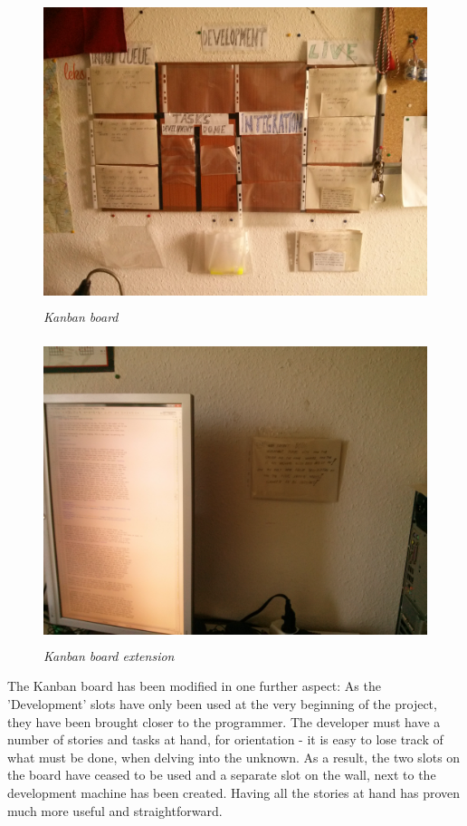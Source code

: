 \documentclass{article}
\begin{document}
\begin{figure}
\includegraphics[height=3.5in,width=6.23in]{./images/kanban/kanban_board.jpg}  
\caption{\small \sl Kanban board \label{fig:kanbanBoard}}
\end{figure}

\begin{figure}
\includegraphics[height=3.5in,width=6.23in]{./images/kanban/kanban_board_extension.jpg}  
\caption{\small \sl Kanban board extension\label{fig:kanbanBoardExtension}}
\end{figure}


The Kanban board has been modified in one further aspect: As the 'Development'
slots have only been used at the very beginning of the project, they have been
brought closer to the programmer. The developer must have a number of stories
and tasks at hand, for orientation - it is easy to lose track of what must be
done, when delving into the unknown. As a result, the two slots on the board
have ceased to be used and a separate slot on the wall, next to the development
machine has been created. Having all the stories at hand has proven much more
useful and straightforward.\newline
\end{document}
